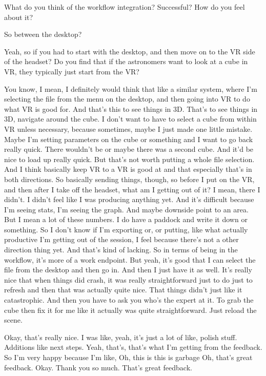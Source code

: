 \begin{description}
  \mich What do you think of the workflow integration? Successful? How do you feel about it?

  \alex So between the desktop?

  \mich Yeah, so if you had to start with the desktop, and then move on to the VR side of the headset? Do you find that if the astronomers want to look at a cube in VR, they typically just start from the VR?

  \alex You know, I mean, I definitely would think that like a similar system, where I'm selecting the file from the menu on the desktop, and then going into VR to do what VR is good for. And that's this to see things in 3D. That's to see things in 3D, navigate around the cube. I don't want to have to select a cube from within VR unless necessary, because sometimes, maybe I just made one little mistake. Maybe I'm setting parameters on the cube or something and I want to go back really quick. There wouldn't be or maybe there was a second cube. And it'd be nice to load up really quick. But that's not worth putting a whole file selection. And I think basically keep VR to a VR is good at and that especially that's in both directions. So basically sending things, though, so before I put on the VR, and then after I take off the headset, what am I getting out of it? I mean, there I didn't. I didn't feel like I was producing anything yet. And it's difficult because I'm seeing stats, I'm seeing the graph. And maybe downside point to an area. But I mean a lot of these numbers. I do have a paddock and write it down or something. So I don't know if I'm exporting or, or putting, like what actually productive I'm getting out of the session, I feel because there's not a other direction thing yet. And that's kind of lacking. So in terms of being in the workflow, it's more of a work endpoint. But yeah, it's good that I can select the file from the desktop and then go in. And then I just have it as well. It's really nice that when things did crash, it was really straightforward just to do just to refresh and then that was actually quite nice. That things didn't just like it catastrophic. And then you have to ask you who's the expert at it. To grab the cube then fix it for me like it actually was quite straightforward. Just reload the scene.

  \mich Okay, that's really nice. I was like, yeah, it's just a lot of like, polish stuff. Additions like next steps. Yeah, that's, that's what I'm getting from the feedback. So I'm very happy because I'm like, Oh, this is this is garbage Oh, that's great feedback. Okay. Thank you so much. That's great feedback.

\end{description}